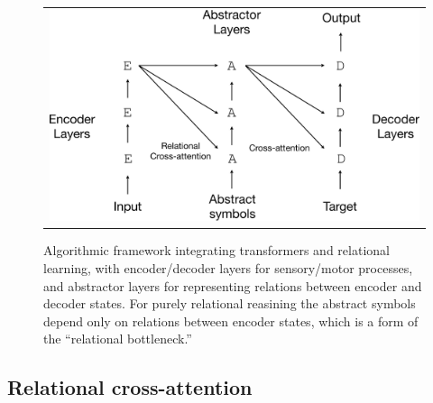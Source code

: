 \begin{figure}[t]
    \vspace{-3mm}
    \begin{center}
    \begin{tabular}{c}
        \hskip5pt\includegraphics[width=.60\textwidth]{figures/algorithm-diagram3-crop}
    \end{tabular}
    \caption{Algorithmic framework integrating transformers and relational learning, with encoder/decoder layers for sensory/motor processes, and abstractor layers for representing relations between encoder and decoder states. For purely relational reasining the abstract symbols depend only on relations between encoder states, which is a form of the ``relational bottleneck.''}
    \label{fig:algo}
    \vskip-12pt
    \end{center}
\end{figure}



\subsection{Relational cross-attention}

